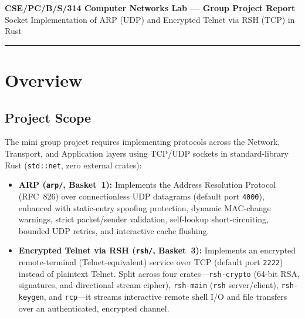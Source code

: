 \documentclass[11pt,a4paper]{article}
\begin{document}
\begin{center}
  {\Large\bfseries CSE/PC/B/S/314 Computer Networks Lab --- Group Project Report}\\[0.25cm]
  {\large Socket Implementation of ARP (UDP) and Encrypted Telnet via RSH (TCP) in Rust}
\end{center}
\vspace{0.1cm}
\hrule
\vspace{0.25cm}

\tableofcontents
\newpage

\section{Overview}

\subsection{Project Scope}
The mini group project requires implementing protocols across the Network, Transport, and Application layers using TCP/UDP sockets in standard-library Rust (\texttt{std::net}, zero external crates):
\begin{itemize}
  \item \textbf{ARP (\texttt{arp/}, Basket~1):} Implements the Address Resolution Protocol (RFC~826) over connectionless UDP datagrams (default port \texttt{4000}), enhanced with static-entry spoofing protection, dynamic MAC-change warnings, strict packet/sender validation, self-lookup short-circuiting, bounded UDP retries, and interactive cache flushing.
  \item \textbf{Encrypted Telnet via RSH (\texttt{rsh/}, Basket~3):} Implements an encrypted remote-terminal (Telnet-equivalent) service over TCP (default port \texttt{2222}) instead of plaintext Telnet. Split across four crates---\texttt{rsh-crypto} (64-bit RSA, signatures, and directional stream cipher), \texttt{rsh-main} (\texttt{rsh} server/client), \texttt{rsh-keygen}, and \texttt{rcp}---it streams interactive remote shell I/O and file transfers over an authenticated, encrypted channel.
\end{itemize}
\end{document}
